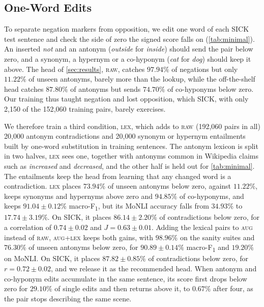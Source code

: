 \documentclass[11pt]{article}
\begin{document}
\subsection{One-Word Edits}
\label{sec:edits}

To separate negation markers from opposition, we edit one word of each SICK test sentence and check the side of zero the signed score falls on (\autoref{tab:minimal}).
An inserted \emph{not} and an antonym (\emph{outside} for \emph{inside}) should send the pair below zero, and a synonym, a hypernym or a co-hyponym (\emph{cat} for \emph{dog}) should keep it above.
The head of \autoref{sec:results}, \textsc{raw}, catches $97.94\%$ of negations but only $11.22\%$ of unseen antonyms, barely more than the lookup, while the off-the-shelf head catches $87.80\%$ of antonyms but sends $74.70\%$ of co-hyponyms below zero.
Our training thus taught negation and lost opposition, which SICK, with only 2{,}150 of the 152{,}060 training pairs, barely exercises.

We therefore train a third condition, \textsc{lex}, which adds to \textsc{raw} (192{,}060 pairs in all) 20{,}000 antonym contradictions and 20{,}000 synonym or hypernym entailments built by one-word substitution in training sentences.
The antonym lexicon is split in two halves, \textsc{lex} sees one, together with antonyms common in Wikipedia claims such as \emph{increased} and \emph{decreased}, and the other half is held out for \autoref{tab:minimal}.
The entailments keep the head from learning that any changed word is a contradiction.
\textsc{lex} places $73.94\%$ of unseen antonyms below zero, against $11.22\%$, keeps synonyms and hypernyms above zero and $94.85\%$ of co-hyponyms, and keeps $91.04 \pm 0.12\%$ macro-F\textsubscript{1}, but its MoNLI accuracy falls from $34.93\%$ to $17.74 \pm 3.19\%$.
On SICK, it places $86.14 \pm 2.20\%$ of contradictions below zero, for a correlation of $0.74 \pm 0.02$ and $J = 0.63 \pm 0.01$.
Adding the lexical pairs to \textsc{aug} instead of \textsc{raw}, \textsc{aug+lex} keeps both gains, with $98.96\%$ on the sanity suites and $76.30\%$ of unseen antonyms below zero, for $90.89 \pm 0.14\%$ macro-F\textsubscript{1} and $19.20\%$ on MoNLI.
On SICK, it places $87.82 \pm 0.85\%$ of contradictions below zero, for $r = 0.72 \pm 0.02$, and we release it as the recommended head.
When antonym and co-hyponym edits accumulate in the same sentence, its score first drops below zero for $29.10\%$ of single edits and then returns above it, to $0.67\%$ after four, as the pair stops describing the same scene.
\end{document}
